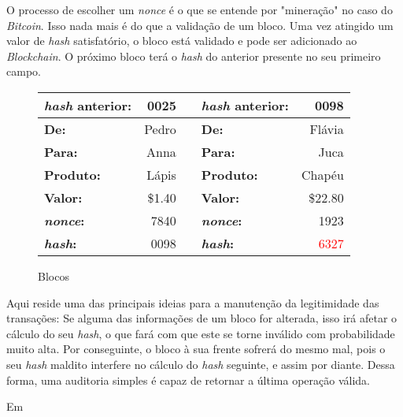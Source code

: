 \documentclass[12pt]{article}
\begin{document}
	O processo de escolher um \textit{nonce} é o que se entende por "mineração" no caso do \textit{Bitcoin}. Isso nada mais é do que a validação de um bloco. Uma vez atingido um valor de \textit{hash} satisfatório, o bloco está validado e pode ser adicionado ao \textit{Blockchain}. O próximo bloco terá o \textit{hash} do anterior presente no seu primeiro campo.\\
	
	\begin{figure}[H]
		\centering
		\begin{tabular}{|lr|c|lr|}
		\hline
		\textbf{\textit{hash} anterior:} & 0025 &\hspace*{1cm}& \textbf{\textit{hash} anterior:} & 0098\\
		\hline
		\textbf{De:} & Pedro & & \textbf{De:} & Flávia \\
		\hline
		\textbf{Para:} & Anna & & \textbf{Para:} & Juca \\
		\hline
		\textbf{Produto:} & Lápis & & \textbf{Produto:} & Chapéu \\
		\hline	
		\textbf{Valor:} & \$1.40 & & \textbf{Valor:} & \$22.80\\
		\hline
		\textbf{\textit{nonce}:} & 7840 & & \textbf{\textit{nonce}:} & 1923 \\
		\hline
		\textbf{\textit{hash}:} & 0098 & & \textbf{\textit{hash}:} & \textcolor{red}{6327} \\
		\hline
		\end{tabular}
		\label{fig:blockchain2}
		\caption{Blocos}
	\end{figure}	
	
	Aqui reside uma das principais ideias para a manutenção da legitimidade das transações: Se alguma das informações de um bloco for alterada, isso irá afetar o cálculo do seu \textit{hash}, o que fará com que este se torne inválido com probabilidade muito alta. Por conseguinte, o bloco à sua frente sofrerá do mesmo mal, pois o seu \textit{hash} maldito interfere no cálculo do \textit{hash} seguinte, e assim por diante. Dessa forma, uma auditoria simples é capaz de retornar a última operação válida.
	
	\quest Em
	
	
	
\end{document}
